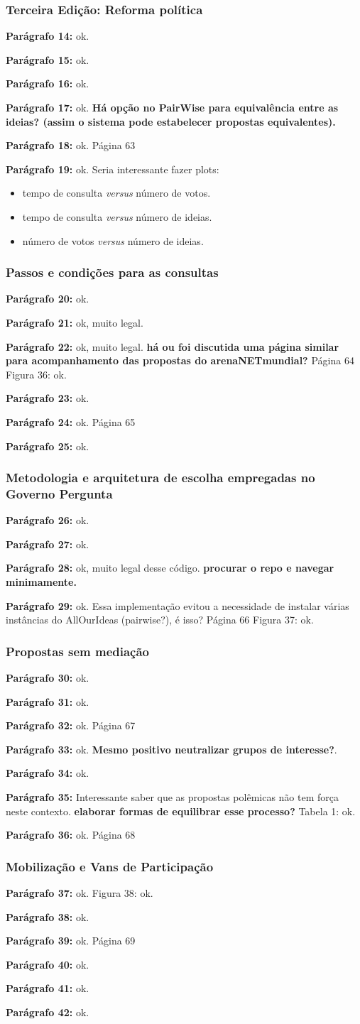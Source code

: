 \documentclass[12pt]{report}
\newcommand{\pp}[1]{

\textbf{Parágrafo #1:}
}
\begin{document}
\subsubsection{Terceira Edição: Reforma política}
\pp{14} ok.
\pp{15} ok.
\pp{16} ok.
\pp{17} ok. {\bf \color{red} Há opção no PairWise para equivalência entre as ideias? (assim o sistema pode estabelecer propostas equivalentes).}
\pp{18} ok.
\noindent Página 63
\pp{19} ok. Seria interessante fazer plots:
\begin{itemize}
    \item tempo de consulta \emph{versus} número de votos. 
    \item tempo de consulta \emph{versus} número de ideias.
    \item número de votos \emph{versus} número de ideias.
\end{itemize}
\subsubsection{Passos e condições para as consultas}
\pp{20} ok.
\pp{21} ok, muito legal.
\pp{22} ok, muito legal. {\bf \color{red} há ou foi discutida uma página similar para acompanhamento das propostas do arenaNETmundial?}
\noindent Página 64
Figura 36: ok.
\pp{23} ok.
\pp{24} ok.
\noindent Página 65
\pp{25} ok.
\subsubsection{Metodologia e arquitetura de escolha empregadas no Governo Pergunta}
\pp{26} ok.
\pp{27} ok.
\pp{28} ok, muito legal desse código. {\bf \color{red} procurar o repo e navegar minimamente.}
\pp{29} ok. Essa implementação evitou a necessidade de instalar várias instâncias do AllOurIdeas (pairwise?), é isso?
\noindent Página 66
Figura 37: ok.
\subsubsection{Propostas sem mediação}
\pp{30} ok.
\pp{31} ok.
\pp{32} ok.
\noindent Página 67
\pp{33} ok. {\bf \color{red} Mesmo positivo neutralizar grupos de interesse?}.
\pp{34} ok.
\pp{35} Interessante saber que as propostas polêmicas não tem força neste contexto. {\bf \color{red} elaborar formas de equilibrar esse processo?}
Tabela 1: ok.
\pp{36} ok.
\noindent Página 68
\subsubsection{Mobilização e Vans de Participação}
\pp{37} ok.
Figura 38: ok.
\pp{38} ok.
\pp{39} ok.
\noindent Página 69
\pp{40} ok.
\pp{41} ok.
\pp{42} ok.
\end{document}
